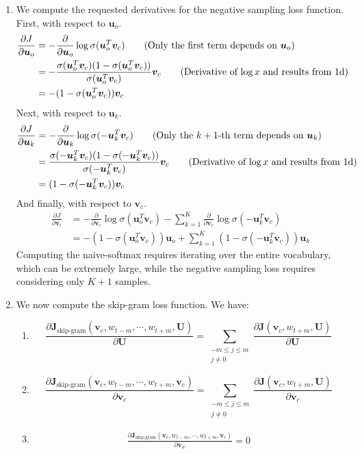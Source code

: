 \documentclass[12pt]{article}
\begin{document}
\begin{enumerate}[label=(\alph*)]
\item We compute the requested derivatives for the negative sampling loss function. First, with respect to $\bm{u}_o$.
\begin{align*}
\frac{\partial J}{\partial \bm{u}_o} &= - \frac{\partial}{\partial \bm{u}_o} \log \sigma(\bm{u}_o^T \bm{v}_c)  \tag{Only the first term depends on $\bm{u}_o$} \\
&= -\frac{\sigma(\bm{u}_o^T \bm{v}_c)(1 - \sigma(\bm{u}_o^T \bm{v}_c))}{\sigma(\bm{u}_o^T\bm{v}_c)} \bm{v}_c \tag{Derivative of $\log x$ and results from 1d} \\
&= -(1 - \sigma(\bm{u}_o^T \bm{v}_c)) \bm{v}_c
\end{align*}
Next, with respect to $\bm{u}_k$.
\begin{align*}
\frac{\partial J}{\partial \bm{u}_k} &= - \frac{\partial}{\partial \bm{u}_k} \log \sigma(-\bm{u}_k^T \bm{v}_c)  \tag{Only the $k+1$-th term depends on $\bm{u}_k$} \\
&= \frac{\sigma(-\bm{u}_k^T \bm{v}_c)(1 - \sigma(-\bm{u}_k^T \bm{v}_c))}{\sigma(-\bm{u}_k^T\bm{v}_c)} \bm{v}_c \tag{Derivative of $\log x$ and results from 1d} \\
&= (1 - \sigma(-\bm{u}_k^T \bm{v}_c)) \bm{v}_c
\end{align*}
And finally, with respect to $\bm{v}_c$.
\begin{align*}
\frac{\partial J}{\partial \bm{v}_c} &= - \frac{\partial}{\partial \bm{v}_c} \log \sigma(\bm{u}_o^T \bm{v}_c) - \sum_{k=1}^K \frac{\partial}{\partial \bm{v}_c} \log \sigma(-\bm{u}_k^T \bm{v}_c)  \\
&= -(1 - \sigma(\bm{u}_o^T \bm{v}_c))\bm{u}_o + \sum_{k=1}^K (1 - \sigma(-\bm{u}_k^T \bm{v}_c)) \bm{u}_k \tag{Previous results} 
\end{align*}
Computing the naive-softmax requires iterating over the entire vocabulary, which can be extremely large, while the negative sampling loss requires considering only $K+1$ samples.

\item We now compute the skip-gram loss function. We have:
\begin{enumerate}[label=\roman*]
  \item 
  $$
  \frac{\partial \bm{J}_{\text{skip-gram}}(\bm{v}_c, w_{t-m}, \cdots, w_{t+m}, \bm{U})}{\partial \bm{U} } = \sum_{\substack{-m \leq j \leq m \\ j \neq 0}} \frac{\partial \bm{J}(\bm{v}_c, w_{t+m}, \bm{U}) }{\partial \bm{U}}
  $$
  \item 
  $$
  \frac{\partial \bm{J}_{\text{skip-gram}}(\bm{v}_c, w_{t-m}, \cdots, w_{t+m}, \bm{v}_c)}{\partial \bm{v}_c } = \sum_{\substack{-m \leq j \leq m \\ j \neq 0}} \frac{\partial \bm{J}(\bm{v}_c, w_{t+m}, \bm{U}) }{\partial \bm{v}_c}
  $$
  \item
  \begin{align*}
  \frac{\partial \bm{J}_{\text{skip-gram}}(\bm{v}_c, w_{t-m}, \cdots, w_{t+m}, \bm{v}_c)}{\partial \bm{v}_w }  = 0 \tag{$w \neq c$}
  \end{align*}
\end{enumerate}
\end{enumerate}
\end{document}
